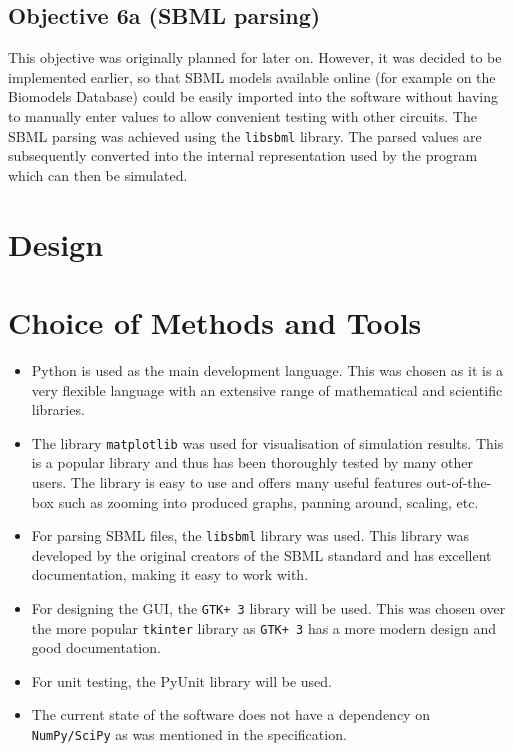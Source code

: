 \documentclass{article}
\begin{document}
	\subsection{Objective 6a (SBML parsing)} 
	This objective was originally planned for later on. However, it was decided to be implemented earlier, so that SBML models available online (for example on the Biomodels Database) could be easily imported into the software without having to manually enter values to allow convenient testing with other circuits. The SBML parsing was achieved using the \verb|libsbml| library. The parsed values are subsequently converted into the internal representation used by the program which can then be simulated. 
	
	
	\section{Design}		%
	
	
	\section{Choice of Methods and Tools}
	\begin{itemize}
		\item Python is used as the main development language. This was chosen as it is a very flexible language with an extensive range of mathematical and scientific libraries.
		\item The library \verb|matplotlib| \cite{matplotlib} was used for visualisation of simulation results. This is a popular library and thus has been thoroughly tested by many other users. The library is easy to use and offers many useful features out-of-the-box such as zooming into produced graphs, panning around, scaling, etc.
		\item For parsing SBML files, the \verb|libsbml| library was used. This library was developed by the original creators of the SBML standard and has excellent documentation, making it easy to work with.
		\item For designing the GUI, the \verb|GTK+ 3| library will be used. This was chosen over the more popular \verb|tkinter| library as \verb|GTK+ 3| has a more modern design and good documentation.
		\item For unit testing, the PyUnit library will be used.
		\item The current state of the software does not have a dependency on \verb|NumPy/SciPy| \cite{numpy, scipy} as was mentioned in the specification.
	\end{itemize}
	
\end{document}

